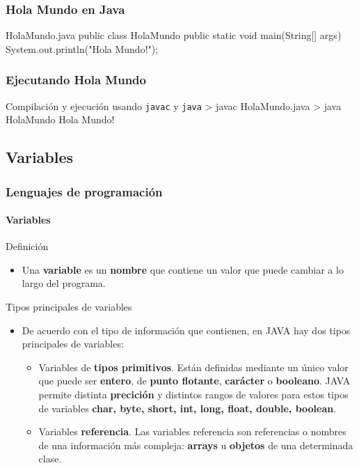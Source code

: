 \documentclass{beamer}
\begin{document}
\begin{frame}[fragile]
  \frametitle{Hola Mundo en Java}

  \begin{java}{HolaMundo.java}
    public class HolaMundo {
      public static void main(String[] args) {
        System.out.println("Hola Mundo!");
      }
    }
  \end{java}

\end{frame}

\begin{frame}[fragile]
  \frametitle{Ejecutando Hola Mundo}

  \begin{bash}{Compilación y ejecución usando {\tt javac} y {\tt java}}
    > javac HolaMundo.java
    > java HolaMundo
    Hola Mundo!
  \end{bash}

\end{frame}


\subsection{Variables}

\begin{frame}
  \frametitle{Lenguajes de programación}
  \framesubtitle{Variables}

  {\scriptsize
    \begin{exampleblock}{Definición}
      \begin{itemize}
      \item Una \textbf{variable} es un \textbf{nombre} que contiene un valor que puede cambiar a lo largo del programa.
      \end{itemize}
    \end{exampleblock}

    \begin{block}{Tipos principales de variables}
      \begin{itemize}
      \item De acuerdo con el tipo de información que contienen, en JAVA hay dos tipos principales de variables:
        \begin{itemize}
        \item {\scriptsize Variables de \textbf{tipos primitivos}. Están definidas mediante un único valor que puede ser \textbf{entero}, de \textbf{punto flotante}, \textbf{carácter} o \textbf{booleano}. JAVA permite distinta \textbf{precición} y distintos rangos de valores para estos tipos de variables \textbf{char, byte, short, int, long, float, double, boolean}.}
        \item {\scriptsize Variables \textbf{referencia}. Las variables referencia son referencias o nombres de una información más compleja: \textbf{arrays} u \textbf{objetos} de una determinada clase.}
        \end{itemize}
      \end{itemize}
    \end{block}
  }
\end{frame}
\end{document}

